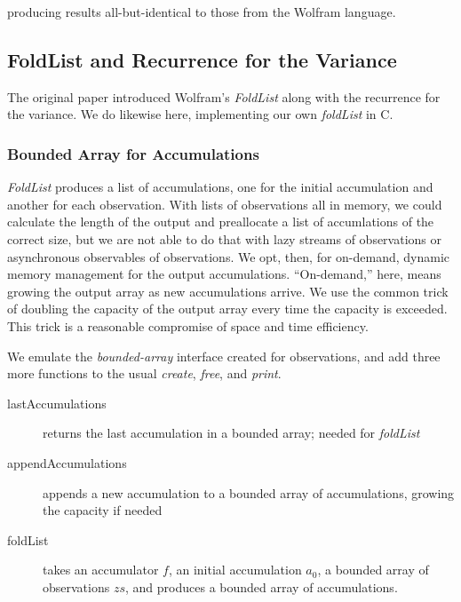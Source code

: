 \documentclass[10pt,oneside,x11names]{article}
\begin{document}
\noindent producing results all-but-identical to those from the Wolfram language.

\subsection{FoldList and Recurrence for the Variance}
\label{sec:orgheadline14}

The original paper introduced Wolfram's \emph{FoldList} along with the recurrence for
the variance. We do likewise here, implementing our own \emph{foldList} in C.

\subsubsection{Bounded Array for Accumulations}
\label{sec:orgheadline12}

\emph{FoldList} produces a list of accumulations, one for the initial accumulation
and another for each observation. With lists of observations all in memory, we
could calculate the length of the output and preallocate a list of accumlations
of the correct size, but we are not able to do that with lazy streams of
observations or asynchronous observables of observations. We opt, then, for
on-demand, dynamic memory management for the output accumulations.
``On-demand,'' here, means growing the output array as new accumulations arrive.
We use the common trick of doubling the capacity of the output array every time
the capacity is exceeded. This trick is a reasonable compromise of space and
time efficiency. 

We emulate the \emph{bounded-array} interface created for observations, and add three
more functions to the usual \emph{create}, \emph{free}, and \emph{print}.
\begin{description}
\item[{lastAccumulations}] returns the last accumulation in a bounded array; needed for
\emph{foldList}
\item[{appendAccumulations}] appends a new accumulation to a bounded array of
accumulations, growing the capacity if needed
\item[{foldList}] takes an accumulator \(f\), an initial accumulation \(a_0\), a bounded
array of observations \(zs\), and produces a bounded array of accumulations.
\end{description}
\end{document}
